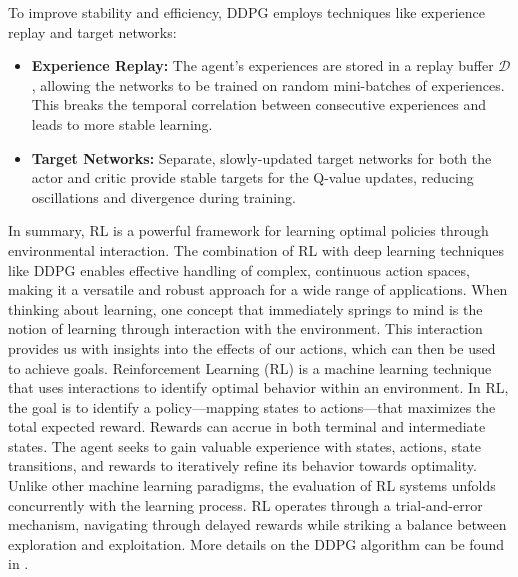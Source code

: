 To improve stability and efficiency, DDPG employs techniques like experience replay and target networks:
\begin{itemize}
	\item \textbf{Experience Replay:} The agent's experiences are stored in a replay buffer \( \mathcal{D} \), allowing the networks to be trained on random mini-batches of experiences. This breaks the temporal correlation between consecutive experiences and leads to more stable learning.
	\item \textbf{Target Networks:} Separate, slowly-updated target networks for both the actor and critic provide stable targets for the Q-value updates, reducing oscillations and divergence during training.
\end{itemize}

In summary, RL is a powerful framework for learning optimal policies through environmental interaction. The combination of RL with deep learning techniques like DDPG enables effective handling of complex, continuous action spaces, making it a versatile and robust approach for a wide range of applications.
When thinking about learning, one concept that immediately springs to mind is the notion of learning through interaction with the environment. This interaction provides us with insights into the effects of our actions, which can then be used to achieve goals. Reinforcement Learning (RL) is a machine learning technique that uses interactions to identify optimal behavior within an environment. In RL, the goal is to identify a policy—mapping states to actions—that maximizes the total expected reward. Rewards can accrue in both terminal and intermediate states. The agent seeks to gain valuable experience with states, actions, state transitions, and rewards to iteratively refine its behavior towards optimality. Unlike other machine learning paradigms, the evaluation of RL systems unfolds concurrently with the learning process. RL operates through a trial-and-error mechanism, navigating through delayed rewards while striking a balance between exploration and exploitation. More details on the DDPG algorithm can be found in \cite{DDPG}.
